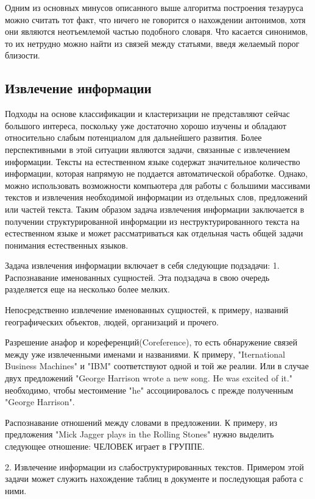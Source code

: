 Одним из основных минусов описанного выше алгоритма построения тезауруса можно считать тот факт,
что ничего не говорится о нахождении антонимов, хотя они являются неотъемлемой частью подобного словаря.
Что касается синонимов, то их нетрудно можно найти из связей между статьями, введя желаемый порог близости.

\subsection{Извлечение информации}

Подходы на основе классификации и кластеризации не представляют сейчас
большого интереса, поскольку уже достаточно хорошо изучены и обладают
относительно слабым потенциалом для дальнейшего развития. 
Более перспективными в этой ситуации являются задачи, связанные с
извлечением информации.
Тексты на естественном языке содержат значительное количество информации,
которая напрямую не поддается автоматической обработке. Однако, можно использовать
возможности компьютера для работы с большими массивами текстов и извлечения
необходимой информации из отдельных слов, предложений или частей текста.
Таким образом задача извлечения информации заключается в получении структурированной
информации из неструктурированного текста на естественном языке и может рассматриваться
как отдельная часть общей задачи понимания естественных языков. 

Задача извлечения информации включает в себя следующие подзадачи:
1. Распознавание именованных сущностей.
   Эта подзадача в свою очередь разделяется еще на несколько более мелких.
   
   Непосредственно извлечение именованных сущностей, к примеру, названий географических
   объектов, людей, организаций и прочего.
   
   Разрешение анафор и кореференций(Coreference), то есть обнаружение связей между уже
   извлеченными именами и названиями. К примеру, "Iternational Business Machines"
   и "IBM" соответствуют одной и той же реалии. Или в случае двух предложений
   "George Harrison wrote a new song. He was excited of it." необходимо, чтобы
   местоимение "he" ассоциировалось с прежде полученным "George Harrison".
   
   Распознавание отношений между словами в предложении. К примеру, из предложения
   "Mick Jagger plays in the Rolling Stones" нужно выделить следующее отношение:
   ЧЕЛОВЕК играет в ГРУППЕ.
   
2. Извлечение информации из слабоструктурированных текстов. 
   Примером этой задачи может служить нахождение таблиц в документе и последующая
   работа с ними.
   
